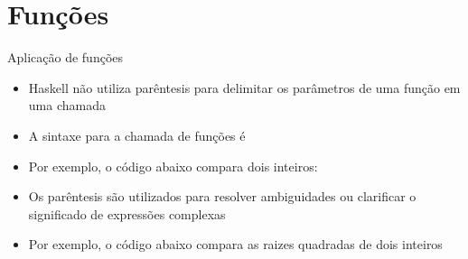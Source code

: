 \section{Funções}

\begin{frame}[fragile]{Aplicação de funções}

    \begin{itemize}
        \item Haskell não utiliza parêntesis para delimitar os parâmetros de uma função em uma
            chamada

        \item A sintaxe para a chamada de funções é


        \item Por exemplo, o código abaixo compara dois inteiros:


        \item Os parêntesis são utilizados para resolver ambiguidades ou clarificar o significado
            de expressões complexas

        \item Por exemplo, o código abaixo compara as raizes quadradas de dois inteiros 

    \end{itemize}

\end{frame}

